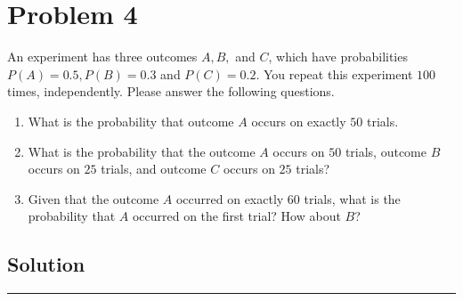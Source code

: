 \section{Problem 4}
An experiment has three outcomes $A, B,$ and $C$, which have probabilities $P(A)=0.5, P(B)=0.3$ and $P(C)=0.2$. You repeat this experiment $100$ times, independently. Please answer the following questions.
\begin{enumerate}[4a.]
	\item What is the probability that outcome $A$ occurs on exactly $50$ trials.
	\item What is the probability that the outcome $A$ occurs on $50$ trials, outcome $B$ occurs on $25$ trials, and outcome $C$ occurs on $25$ trials?
	\item Given that the outcome $A$ occurred on exactly $60$ trials, what is the probability that $A$ occurred on the first trial? How about $B$?
\end{enumerate}
\subsection{Solution}

\noindent\rule{\textwidth}{1pt}